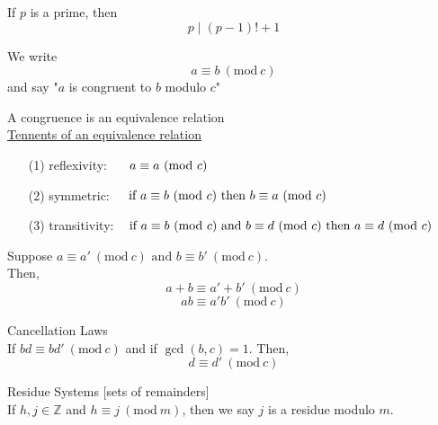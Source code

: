 \documentclass{article}
\newcommand{\Mod}[1]{\ (\mathrm{mod}\ #1)}
\begin{document}
\vspace{0.5cm}
If \(p\) is a prime, then
\[p \mid (p-1)!+1\]

\vspace{0.5cm}
 We write
\[a \equiv b \Mod{c}\]
and say "\(a\) is congruent to \(b\) modulo \(c\)"

\vspace{0.5cm}
 A congruence is an equivalence relation\\
\underline{Tennents of an equivalence relation}
\begin{enumerate}
    \item[(1)] reflexivity: \(\hspace{0.5cm} a \equiv a \Mod{c}\)
    \item[(2)] symmetric: \(\hspace{0.4cm} \text{if } a \equiv b \Mod{c} \text{ then } b \equiv a \Mod{c}\)
    \item[(3)] transitivity: \(\hspace{0.3cm} \text{if } a \equiv b \Mod{c} \text{ and } b \equiv d \Mod{c} \text{ then } a \equiv d \Mod{c}\) 
\end{enumerate}

\vspace{0.5cm}
 Suppose \(a \equiv a' \Mod{c} \text{ and } b \equiv b' \Mod{c}\).\\
Then,
\[a+b \equiv a'+b' \Mod{c}\]
\[ab \equiv a'b' \Mod{c}\]

\vspace{0.5cm}
 Cancellation Laws\\
If \(bd \equiv bd' \Mod{c}\) and if \(\gcd(b,c)=1\). Then,
\[d \equiv d' \Mod{c}\]

\vspace{0.5cm}
 Residue Systems [sets of remainders]\\
If \(h,j \in \mathbb{Z}\) and \(h \equiv j \Mod{m}\), then we say \(j\) is a residue modulo \(m\).
\end{document}
